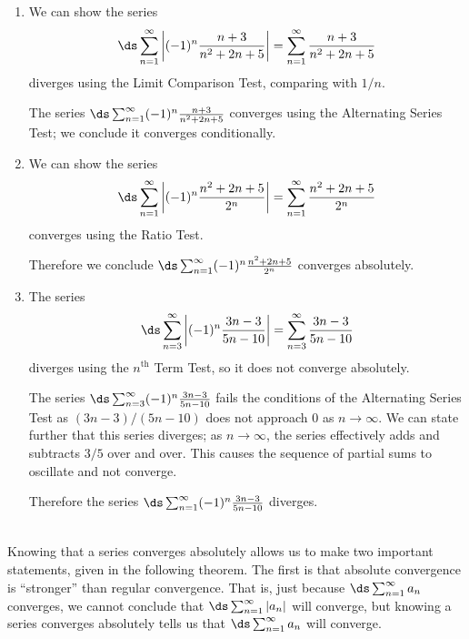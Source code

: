 {\begin{enumerate}
	\item We can show the series $$\ds \sum_{n=1}^\infty \left|(-1)^n\frac{n+3}{n^2+2n+5}\right|= \sum_{n=1}^\infty \frac{n+3}{n^2+2n+5}$$ diverges using the Limit Comparison Test, comparing with $1/n$. 
	
	The series $\ds \sum_{n=1}^\infty (-1)^n\frac{n+3}{n^2+2n+5}$ converges using the Alternating Series Test; we conclude it converges conditionally.
	
	\item	We can show the series $$\ds \sum_{n=1}^\infty \left|(-1)^n\frac{n^2+2n+5}{2^n}\right|=\sum_{n=1}^\infty \frac{n^2+2n+5}{2^n}$$  converges using the Ratio Test. 
	
	Therefore we conclude $\ds \sum_{n=1}^\infty (-1)^n\frac{n^2+2n+5}{2^n}$ converges absolutely.
	
	\item	The series $$\ds \sum_{n=3}^\infty \left|(-1)^n\frac{3n-3}{5n-10}\right| = \sum_{n=3}^\infty \frac{3n-3}{5n-10}$$ diverges using the $n^\text{th}$ Term Test, so it does not converge absolutely. 
	
	The series $\ds \sum_{n=3}^\infty (-1)^n\frac{3n-3}{5n-10}$ fails the conditions of the Alternating Series Test as $(3n-3)/(5n-10)$ does not approach $0$ as $n\to\infty$. We can state further that this series diverges; as $n\to\infty$, the series effectively adds and subtracts $3/5$ over and over. This causes the sequence of partial sums to oscillate and not converge.
	
	Therefore the series $\ds \sum_{n=1}^\infty (-1)^n\frac{3n-3}{5n-10}$ diverges.
\end{enumerate}
\baselineskip
}\\

Knowing that a series converges absolutely allows us to make two important statements, given in the following theorem. The first is that absolute convergence is  ``stronger'' than regular convergence. That is, just because {\small$\ds \sum_{n=1}^\infty a_n$} converges, we cannot conclude that {\small$\ds \sum_{n=1}^\infty |a_n|$} will converge, but knowing a series converges absolutely tells us that {\small$\ds \sum_{n=1}^\infty a_n$} will converge. 

